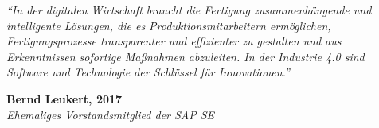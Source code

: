 \documentclass[
	12pt,
	BCOR=5mm,
	DIV=12,
	headinclude=on,
	footinclude=off,
	parskip=half,
	bibliography=totoc,
	listof=entryprefix,
	toc=listof,
	pointlessnumbers,
	plainfootsepline]{scrreprt}
\begin{document}

 


\normalfont
\setlength{}
\renewcommand*{\textflush}{flushright}
\renewcommand*{\epigraphsize}{\normalsize}
\setlength\epigraphrule{0pt}
\renewcommand{\epigraphflush}{flushright}
\def\quotepage{%
      \clearpage%
      \thispagestyle{empty}%
      \addtocounter{page}{-1}%
      \pagebreak
      \hspace{0pt}
      \vfill
      \epigraph{\itshape \enquote{In der digitalen Wirtschaft braucht die Fertigung zusammenhängende und intelligente Lösungen, die es Produktionsmitarbeitern ermöglichen, Fertigungsprozesse transparenter und effizienter zu gestalten und aus Erkenntnissen sofortige Maßnahmen abzuleiten. In der Industrie 4.0 sind Software und Technologie der Schlüssel für Innovationen.}}{\textbf{Bernd Leukert, 2017} \cite{Schell.2017} \\ \textit{Ehemaliges Vorstandsmitglied der SAP SE}}
      \vfill
    \hspace{0pt}
    \pagebreak
      \clearpage
      }

% 

\quotepage
\newpage



\tableofcontents

\listoftodos





\listoffigures

\listoftables
\end{document}
